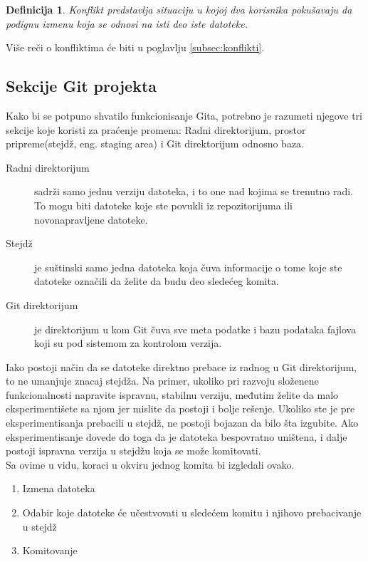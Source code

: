 \documentclass[a4paper]{article}
\newtheorem{definicija}{Definicija}[section]
\begin{document}
{\begin{definicija}
Konflikt predstavlja situaciju u kojoj dva korisnika pokušavaju da podignu izmenu koja se odnosi na isti deo iste datoteke.
\end{definicija}
Više reči o konfliktima će biti u poglavlju \ref{subsec:konflikti}.


\subsection{Sekcije Git projekta}
\label{subsec:sekcije}
Kako bi se potpuno shvatilo funkcionisanje Gita, potrebno je razumeti njegove tri sekcije koje koristi za praćenje promena: Radni direktorijum, prostor pripreme(stejdž, eng. staging area) i Git direktorijum odnosno baza.\\
\begin{description}

\item[Radni direktorijum] sadrži samo jednu verziju datoteka, i to one nad kojima se trenutno radi. To mogu biti datoteke koje ste povukli iz repozitorijuma ili novonapravljene datoteke.\\

\item[Stejdž] je suštinski samo jedna datoteka koja čuva informacije o tome koje ste datoteke označili da želite da budu deo sledećeg komita.\\

\item[Git direktorijum] je direktorijum u kom Git čuva sve meta podatke i bazu podataka fajlova koji su pod sistemom za kontrolom verzija.\\


\end{description}

Iako postoji način da se datoteke direktno prebace iz radnog u Git direktorijum, to ne umanjuje znacaj stejdža. Na primer, ukoliko pri razvoju složenene funkcionalnosti napravite ispravnu, stabilnu verziju, međutim želite da malo eksperimentišete sa njom jer mislite da postoji i bolje rešenje. Ukoliko ste je pre eksperimentisanja prebacili u stejdž, ne postoji bojazan da bilo šta izgubite. Ako eksperimentisanje dovede do toga da je datoteka bespovratno uništena, i dalje postoji ispravna verzija u stejdžu koja se može komitovati.\\

Sa ovime u vidu, koraci u okviru jednog komita bi izgledali ovako.
\begin{enumerate}
\item Izmena datoteka
\item Odabir koje datoteke će učestvovati u sledećem komitu i njihovo prebacivanje u stejdž
\item Komitovanje
\end{enumerate}

}
\end{document}
